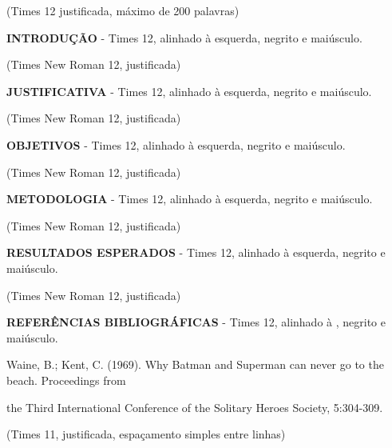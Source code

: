 \documentclass[a4paper,10pt]{article}
\begin{document}
  (Times 12 justificada, máximo de 200 palavras)

  \vspace{1ex}
  \noindent
  \textbf{INTRODUÇÃO} - Times 12, alinhado à esquerda, negrito e maiúsculo.

  (Times New Roman 12, justificada)

  \vspace{1ex}
  \noindent
  \textbf{JUSTIFICATIVA} - Times 12, alinhado à esquerda, negrito e maiúsculo.

  (Times New Roman 12, justificada)

  \noindent
  \textbf{OBJETIVOS} - Times 12, alinhado à esquerda, negrito e maiúsculo.

  (Times New Roman 12, justificada)

  \vspace{1ex}
  \noindent
  \textbf{METODOLOGIA} - Times 12, alinhado à esquerda, negrito e maiúsculo.

  (Times New Roman 12, justificada)

  \vspace{1ex}
  \noindent
  \textbf{RESULTADOS ESPERADOS} - Times 12, alinhado à esquerda, negrito e maiúsculo.

  (Times New Roman 12, justificada)

  \vspace{1ex}
  \noindent
  \textbf{REFERÊNCIAS BIBLIOGRÁFICAS} - Times 12, alinhado à , negrito e maiúsculo.

  \vspace{1ex}
  \noindent
  Waine, B.; Kent, C. (1969). Why Batman and Superman can never go to the beach. Proceedings from

  the Third International Conference of the Solitary Heroes Society, 5:304-309.

  (Times 11, justificada, espaçamento simples entre linhas)


\end{document}
